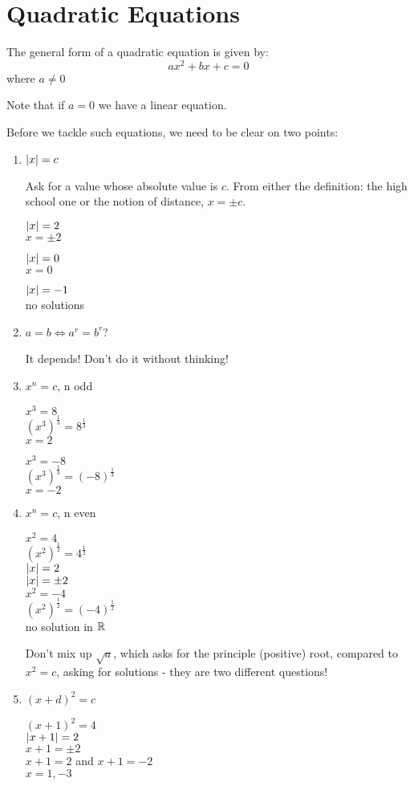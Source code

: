 \documentclass[letterpaper,12pt,fleqn]{article}
\begin{document}
\section*{Quadratic Equations}

\begin{definition}
  The general form of a quadratic equation is given by:
  \[ax^2+bx+c=0\]
  where $a\ne0$
\end{definition}

Note that if $a=0$ we have a linear equation.

Before we tackle such equations, we need to be clear on two points:
\begin{enumerate}
\item $\lvert x\rvert=c$

  Ask for a value whose absolute value is $c$. From either the definition:
  the high school one or the notion of distance, $x=\pm c$.

  $\lvert x\rvert=2$ \\
  $x=\pm2$

  $\lvert x\rvert=0$ \\
  $x=0$

  $\lvert x\rvert=-1$ \\
  no solutions

\item $a=b\iff a^r=b^r$?

  It depends! Don't do it without thinking!

\item $x^n=c$, n odd

  $x^3=8$ \\
  $(x^3)^{\frac{1}{3}}=8^{\frac{1}{3}}$ \\
  $x=2$

  $x^3=-8$ \\
  $(x^3)^{\frac{1}{3}}=(-8)^{\frac{1}{3}}$ \\
  $x=-2$

\item $x^n=c$, n even

  $x^2=4$ \\
  $(x^2)^{\frac{1}{2}}=4^{\frac{1}{2}}$ \\
  $\lvert x\rvert=2$ \\
  $\lvert x\rvert=\pm2$ \\

  $x^2=-4$ \\
  $(x^2)^{\frac{1}{2}}=(-4)^{\frac{1}{2}}$ \\
  no solution in $\mathbb{R}$

  Don't mix up $\sqrt{a}$, which asks for the principle (positive) root,
  compared to $x^2=c$, asking for solutions - they are two different questions!

\item $(x+d)^2=c$

  $(x+1)^2=4$ \\
  $\lvert x+1\rvert=2$ \\
  $x+1=\pm2$ \\
  $x+1=2$ and $x+1=-2$ \\
  $x=1,-3$
\end{enumerate}
\end{document}
